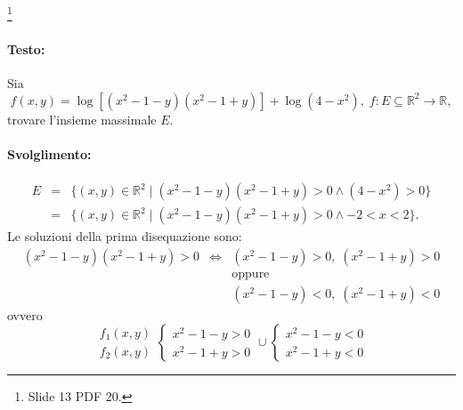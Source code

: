 \begin{example}
	\footnote{Slide 13 PDF 20.}
	\paragraph{Testo:} Sia
	\begin{equation*}
		f(x,y) = \log[(x^2-1-y)(x^2-1+y)] + \log(4-x^2),\; f\colon E\subseteq \mathbb{R}^2\rightarrow\mathbb{R},
	\end{equation*}
	trovare l'insieme massimale $E$.
	\paragraph{Svolglimento:}
	\begin{equation*}
		\begin{matrix}
			E&=&\{(x,y)\in\mathbb{R}^2\;|\; (x^2-1-y)(x^2-1+y)>0\land (4-x^2)>0\}\\
			&=&\{(x,y)\in\mathbb{R}^2\;|\; (x^2-1-y)(x^2-1+y)>0\land -2<x<2\}.
		\end{matrix}
	\end{equation*}
	Le soluzioni della prima disequazione sono:
	\begin{equation*}
		\begin{matrix}
			(x^2-1-y)(x^2-1+y) > 0 &\iff& (x^2-1-y)>0,\; (x^2-1+y) > 0 \\
			&&\text{oppure}\\
			&& (x^2-1-y)<0,\; (x^2-1+y) < 0
		\end{matrix}
	\end{equation*}
	ovvero
	\begin{equation*}
		\begin{matrix}
			f_1(x,y)\\
			f_2(x,y)
		\end{matrix}
		\begin{cases}
			x^2-1-y>0\\
			x^2 -1 + y>0
		\end{cases}
		\cup
		\begin{cases}
			x^2-1-y<0\\
			x^2-1+y<0
		\end{cases}
	\end{equation*}

\end{example}
